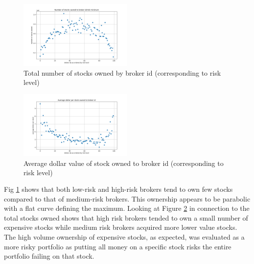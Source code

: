 \documentclass[letterpaper, 11 pt, proceedings]{IEEEtran}
\begin{document}
	\begin{figure}[h]
		\centering
		\includegraphics[width=0.5\textwidth]{stocksOwnedToBrokerIds.png}
		\caption{Total number of stocks owned by broker id (corresponding to risk level)}
		\label{totalvID}
	\end{figure}

	
	\begin{figure}[h]
		\centering
		\includegraphics[width=0.5\textwidth]{averageDollarPerStockToBrokerIds.png}
		\caption{Average dollar value of stock owned to broker id (corresponding to risk level)}
		\label{dollarValue}
	\end{figure}
	\FloatBarrier
	
	Fig \ref{totalvID} shows that both low-risk and high-risk brokers tend to own few stocks compared to that of medium-risk brokers. This ownership appears to be parabolic with a flat curve defining the maximum. Looking at Figure \ref{dollarValue} in connection to the total stocks owned shows that high risk brokers tended to own a small number of expensive stocks while medium risk brokers acquired more lower value stocks. The high volume ownership of expensive stocks, as expected, was evaluated as a more risky portfolio as putting all money on a specific stock risks the entire portfolio failing on that stock.

	
\end{document}
